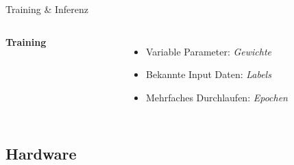 \begin{frame}{Training \& Inferenz}
    \begin{columns}[T]
        \textbf{Training}
        \begin{figure}
            \centering
            \def\svgwidth{0.8\columnwidth}
            
        \end{figure}
        \begin{itemize}
            \item Variable Parameter: \textit{Gewichte}
            \item Bekannte Input Daten: \textit{Labels}
            \item Mehrfaches Durchlaufen: \textit{Epochen}
        \end{itemize}
    \end{columns}
\end{frame}



\subsection[\thesection .\thesubsection \ 
Hardware]{Hardware}\label{subsec:hw}

